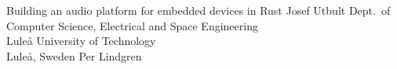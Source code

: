 \documentclass[12pt,a4paper,openright,final,twoside]{LTU-Report-Theme/cseethesis}
\begin{document}





\def\thesistitle{Building an audio platform for embedded devices in Rust}

\def\theauthor{Josef Utbult}
\def\theaddress{Dept.\ of Computer Science, Electrical and Space Engineering\\
Luleå University of Technology\\ Luleå, Sweden}

\def\supervisors{Per Lindgren}

\def\supervisorstring{Supervisor:} 

\def\dedication{}

\def\theabstract{}
\def\thepreface{}

\createpreamble
  {\thesistitle}
  {\theauthor}
  {\theaddress}
  {\supervisors}
  {\dedication}
  {\theabstract}
  {\thepreface}

\startchapters
\begin{bibunit}[IEEEtran]

	
	
	
	
	
	
	

	\makebib
\end{bibunit}
\end{document}
